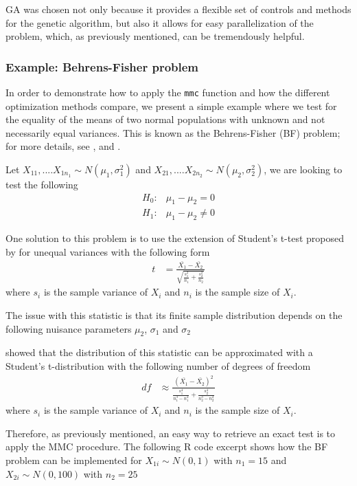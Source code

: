 \documentclass[11pt]{article}\usepackage[]{graphicx}\usepackage[]{color}
\newcommand{\pkg}[1]{{\normalfont\fontseries{b}\selectfont #1}}
\let\proglang=\textsf
\let\code=\texttt
\begin{document}
	\pkg{GA} was chosen not only because it provides a flexible set of controls and methods for the genetic algorithm, but also it allows for easy parallelization of the problem, which, as previously mentioned, can be tremendously helpful.

	\subsubsection{Example: Behrens-Fisher problem}

	In order to demonstrate how to apply the \code{mmc} function and how the different optimization methods compare, we present a simple example where we test for the equality of the means of two normal populations with unknown and not necessarily equal variances. This is known as the Behrens-Fisher (BF) problem; for more details, see \cite{fisher_fiducial_1935}, \cite{fisher_asymptotic_1941} and  \cite{behrens_beitrag_1929}.

	Let $X_{11},....X_{1n_1} \sim N(\mu_1,\sigma_1^2)$ and $X_{21},....X_{2n_2} \sim N(\mu_2,\sigma_2^2)$, we are looking to test the following
	\begin{align}
		H_0 :  &  \mu_1-\mu_2=0\\
		H_1 :  &  \mu_1-\mu_2 \neq 0
	\end{align}

	One solution to this problem is to use the extension of Student's t-test proposed by \cite{welch_generalization_1947} for unequal variances with the following form
	\begin{align}
		t & = \frac{\bar{X_1}-\bar{X_2}}{\sqrt{\frac{s_1^2}{n_1}+\frac{s_2^2}{n_2}}}
	\end{align}
	where $s_i$ is the sample variance of $X_i$ and $n_i$ is the sample size of $X_i$.

	The issue with this statistic is that its finite sample distribution depends on the following nuisance parameters $\mu_2$, $\sigma_1$ and $\sigma_2$

	\cite{welch_significance_1938} showed that the distribution of this statistic can be approximated with a Student's t-distribution with the following number of degrees of freedom
	\begin{align}
		df & \approx \frac{{\left( \bar{X_1}-\bar{X_2} \right)} ^2}{\frac{s_1^4}{n_1^3-n_1^2}+\frac{s_2^4}{n_2^3-n_2^2}}
	\end{align}
	where $s_i$ is the sample variance of $X_i$ and $n_i$ is the sample size of $X_i$.

	Therefore, as previously mentioned, an easy way to retrieve an exact test is to apply the MMC procedure. The following \proglang{R} code excerpt shows how the BF problem can be implemented for $X_{1i} \sim N(0,1)$ with $n_1=15$ and $X_{2i} \sim N(0,100)$ with $n_2=25$
\end{document}

